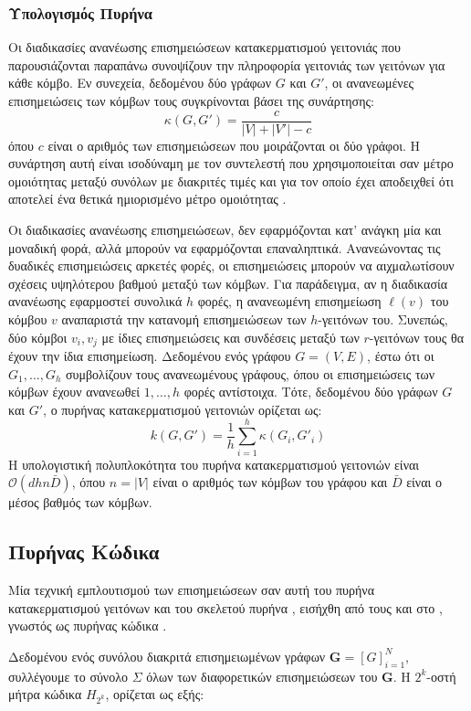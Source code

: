 \subsubsection{Υπολογισμός Πυρήνα}
Οι διαδικασίες ανανέωσης επισημειώσεων κατακερματισμού γειτονιάς που παρουσιάζονται παραπάνω συνοψίζουν την πληροφορία γειτονιάς των γειτόνων για κάθε κόμβο.
Εν συνεχεία, δεδομένου δύο γράφων $G$ και $G'$, οι ανανεωμένες επισημειώσεις των κόμβων τους συγκρίνονται βάσει της συνάρτησης:
\begin{equation}
    \kappa(G, G') = \frac{c}{|V| + |V'| - c}
\end{equation}
όπου $c$ είναι ο αριθμός των επισημειώσεων που μοιράζονται οι δύο γράφοι.
Η συνάρτηση αυτή είναι ισοδύναμη με τον συντελεστή \textit{} που χρησιμοποιείται σαν μέτρο ομοιότητας μεταξύ συνόλων με διακριτές τιμές και για τον οποίο έχει αποδειχθεί ότι αποτελεί ένα θετικά ημιορισμένο μέτρο ομοιότητας \cite{gower1971general}.\par
Οι διαδικασίες ανανέωσης επισημειώσεων, δεν εφαρμόζονται κατ' ανάγκη μία και μοναδική φορά, αλλά μπορούν να εφαρμόζονται επαναληπτικά.
Ανανεώνοντας τις δυαδικές επισημειώσεις αρκετές φορές, οι επισημειώσεις μπορούν να αιχμαλωτίσουν σχέσεις υψηλότερου βαθμού μεταξύ των κόμβων.
Για παράδειγμα, αν η διαδικασία ανανέωσης εφαρμοστεί συνολικά $h$ φορές, η ανανεωμένη επισημείωση $\ell(v)$ του κόμβου $v$ αναπαριστά την κατανομή επισημειώσεων των $h$-γειτόνων του.
Συνεπώς, δύο κόμβοι $v_i, v_j$ με ίδιες επισημειώσεις και συνδέσεις μεταξύ των $r$-γειτόνων τους θα έχουν την ίδια επισημείωση.
Δεδομένου ενός γράφου $G=(V,E)$, έστω ότι οι $G_1, \ldots, G_h$ συμβολίζουν τους ανανεωμένους γράφους, όπου οι επισημειώσεις των κόμβων έχουν ανανεωθεί $1,\ldots,h$ φορές αντίστοιχα.
Τότε, δεδομένου δύο γράφων $G$ και $G'$, ο πυρήνας κατακερματισμού γειτονιών ορίζεται ως:
\begin{equation}
    k(G, G') = \frac{1}{h} \sum_{i=1}^h \kappa(G_i, G'_i)
\label{eq:framework_sum}
\end{equation}
Η υπολογιστική πολυπλοκότητα του πυρήνα κατακερματισμού γειτονιών είναι $\mathcal{O}(dhn\bar{D})$, όπου $n=|V|$ είναι ο αριθμός των κόμβων του γράφου και $\bar{D}$ είναι ο μέσος βαθμός των κόμβων.

\subsection{Πυρήνας Κώδικα }
\label{ssec:hc}
Μία τεχνική εμπλουτισμού των επισημειώσεων σαν αυτή του πυρήνα κατακερματισμού γειτόνων και του σκελετού πυρήνα , εισήχθη από τους  και  στο \cite{Kataoka}, γνωστός ως πυρήνας κώδικα .\par
Δεδομένου ενός συνόλου διακριτά επισημειωμένων γράφων $\mathbf{G}=[G]^{N}_{i=1}$, συλλέγουμε το σύνολο $\Sigma$ όλων των διαφορετικών επισημειώσεων του $\mathbf{G}$.
Η $2^{k}$-οστή μήτρα κώδικα  $H_{2^{k}}$, ορίζεται ως εξής:

